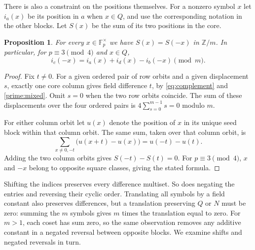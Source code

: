 \documentclass[11pt,a4paper]{article}
\newtheorem{proposition}[theorem]{Proposition}
\numberwithin{equation}{section}
\begin{document}
There is also a constraint on the positions themselves. For a nonzero symbol $x$ let $i_a(x)$ be its position in $a$ when $x\in Q$, and use the corresponding notation in the other blocks. Let $S(x)$ be the sum of its two positions in the core.

\begin{proposition}\label{prime:sumpositions}
For every $x\in\mathbb F_p^\times$ we have $S(x)=S(-x)$ in $\mathbb Z/m$. In particular, for $p\equiv3\pmod4$ and $x\in Q$,
$$i_c(-x)=i_a(x)+i_d(x)-i_b(-x)\pmod m.$$
\end{proposition}
\begin{proof}
Fix $t\ne0$. For a given ordered pair of row orbits and a given displacement $s$, exactly one core column gives field difference $t$, by \eqref{eq:complement} and \eqref{prime:mixed}. Omit $s=0$ when the two row orbits coincide. The sum of these displacements over the four ordered pairs is $4\sum_{s=0}^{m-1}s=0$ modulo $m$.

For either column orbit let $u(x)$ denote the position of $x$ in its unique seed block within that column orbit. The same sum, taken over that column orbit, is
$$\sum_{x\ne0,-t}\big(u(x+t)-u(x)\big)=u(-t)-u(t).$$
Adding the two column orbits gives $S(-t)-S(t)=0$. For $p\equiv3\pmod4$, $x$ and $-x$ belong to opposite square classes, giving the stated formula.
\end{proof}

Shifting the indices preserves every difference multiset. So does negating the entries and reversing their cyclic order. Translating all symbols by a field constant also preserves differences, but a translation preserving $Q$ or $N$ must be zero: summing the $m$ symbols gives $m$ times the translation equal to zero. For $m>1$, each coset has sum zero, so the same observation removes any additive constant in a negated reversal between opposite blocks. We examine shifts and negated reversals in turn.
\end{document}
